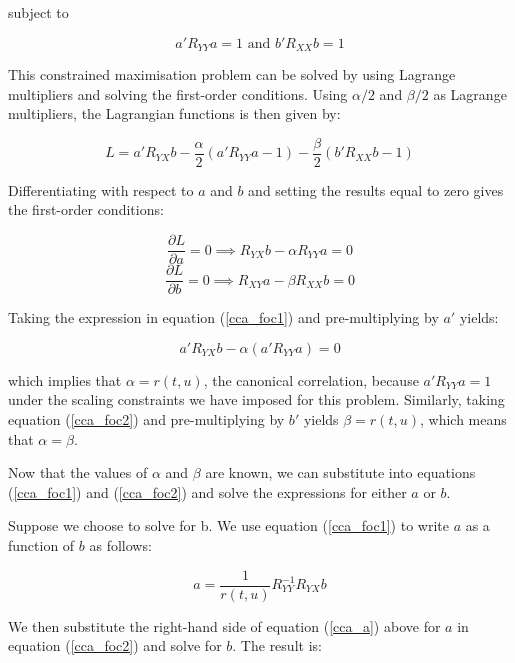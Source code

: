subject to 

\begin{equation}
\label{cca_constraints}
a'R_{YY}a = 1 \text{ and } b'R_{XX}b = 1
\end{equation}

This constrained maximisation problem can be solved by using Lagrange multipliers and solving the first-order conditions. Using $\alpha/2$ and $\beta/2$ as Lagrange multipliers, the Lagrangian functions is then given by:

\begin{equation}
 L = a'R_{YX}b - \frac{\alpha}{2}(a'R_{YY}a - 1) - \frac{\beta}{2}(b'R_{XX}b - 1) 
\end{equation}

Differentiating with respect to $a$ and $b$ and setting the results equal to zero gives the first-order conditions:

\begin{equation}
\label{cca_foc1}
  \frac{\partial L}{\partial a} = 0 \implies R_{YX}b - \alpha R_{YY}a = 0
\end{equation}
\begin{equation}
\label{cca_foc2}
 \frac{\partial L}{\partial b} = 0 \implies R_{XY}a - \beta R_{XX}b = 0
\end{equation}

Taking the expression in equation (\ref{cca_foc1}) and pre-multiplying by $a'$ yields:

$$a'R_{YX}b - \alpha (a'R_{YY}a) = 0$$

which implies that $\alpha = r(t,u) $, the canonical correlation, because $a'R_{YY}a=1$ under the scaling constraints we have imposed for this problem. Similarly, taking equation (\ref{cca_foc2}) and pre-multiplying by $b'$ yields $\beta = r(t,u)$, which means that $\alpha = \beta$.

Now that the values of $\alpha$ and $\beta$ are known, we can substitute into equations (\ref{cca_foc1}) and (\ref{cca_foc2}) and solve the expressions for either $a$ or $b$.

Suppose we choose to solve for b. We use equation (\ref{cca_foc1}) to write $a$ as a function of $b$ as follows:

\begin{equation}
\label{cca_a}
  a = \frac{1}{r(t,u)}R^{-1}_{YY}R_{YX}b
\end{equation}

We then substitute the right-hand side of equation (\ref{cca_a}) above for $a$ in equation (\ref{cca_foc2}) and solve for $b$. The result is:


